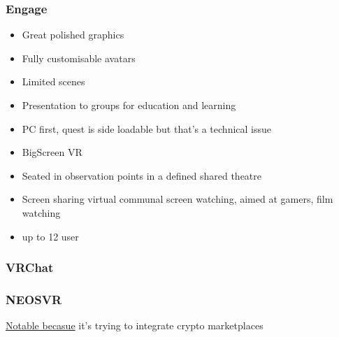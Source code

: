 \subsubsection{Engage}
\begin{itemize}
\item Great polished graphics
\item Fully customisable avatars
\item Limited scenes
\item Presentation to groups for education and learning
\item PC first, quest is side loadable but that's a technical issue
\item BigScreen VR
\item Seated in observation points in a defined shared theatre
\item Screen sharing virtual communal screen watching, aimed at gamers, film watching
\item up to 12 user
\end{itemize}
\subsubsection{VRChat}
\lipsum[50]
\subsubsection{NEOSVR}
\href{https://neos.com/}{Notable becasue} it's trying to integrate crypto marketplaces
